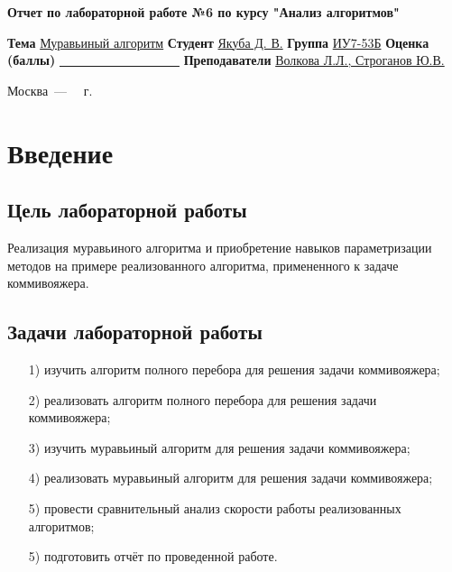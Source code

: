 \documentclass[12pt]{report}
\begin{document}
\begin{titlepage}
	
	\begin{center}
		\Large\textbf{Отчет по лабораторной работе №6 по курсу "Анализ алгоритмов"}\newline
	\end{center}
	
	\noindent\textbf{Тема} \underline{Муравьиный алгоритм}\newline\newline\newline
	\noindent\textbf{Студент} \underline{Якуба Д. В.}\newline\newline
	\noindent\textbf{Группа} \underline{ИУ7-53Б}\newline\newline
	\noindent\textbf{Оценка (баллы)} \underline{~~~~~~~~~~~~~~~~~~~}\newline\newline
	\noindent\textbf{Преподаватели} \underline{Волкова Л.Л., Строганов Ю.В.}\newline
	
	\begin{center}
		\vfill
		Москва~---~\the\year
		~г.
	\end{center}
\end{titlepage}

\setcounter{page}{2}

\tableofcontents

\newpage
\chapter*{Введение}
\section*{Цель лабораторной работы}
Реализация муравьиного алгоритма и приобретение навыков параметризации методов на примере реализованного алгоритма, примененного к задаче коммивояжера.
\section*{Задачи лабораторной работы}
\begin{enumerate}
\item[1)] изучить алгоритм полного перебора для решения задачи коммивояжера;
\item[2)] реализовать алгоритм полного перебора для решения задачи коммивояжера;
\item[3)] изучить муравьиный алгоритм для решения задачи коммивояжера;
\item[4)] реализовать муравьиный алгоритм для решения задачи коммивояжера;
\item[5)] провести сравнительный анализ скорости работы реализованных алгоритмов;
\item[5)] подготовить отчёт по проведенной работе.
\end{enumerate}
\end{document}
